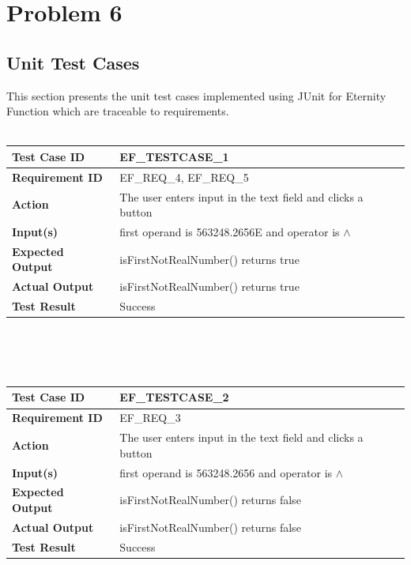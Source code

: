 \documentclass[11pt, english]{report}
\begin{document}
\chapter{Problem 6}

\section{Unit Test Cases}

This section presents the unit test cases implemented using JUnit for Eternity Function which are traceable to requirements. \\ \\

\setlength{\tabcolsep}{18pt}
\renewcommand{\arraystretch}{1.5}
\begin{tabular}{ |p{4cm}|p{8cm}| }
\hline
\textbf{Test Case ID} & EF\_TESTCASE\_1 \\ \hline 
\textbf{Requirement ID} & EF\_REQ\_4, EF\_REQ\_5\\ \hline
\textbf{Action} & The user enters input in the text field and clicks a button \\ \hline
\textbf{Input(s)} & first operand is 563248.2656E and operator is $\wedge$  \\ \hline
\textbf{Expected Output} & isFirstNotRealNumber() returns true \\ \hline
\textbf{Actual Output} & isFirstNotRealNumber() returns true \\ \hline
\textbf{Test Result} & Success \\ 
\hline
\end{tabular} \\ \\ \\

\setlength{\tabcolsep}{18pt}
\renewcommand{\arraystretch}{1.5}
\begin{tabular}{ |p{4cm}|p{8cm}| }
\hline
\textbf{Test Case ID} &  EF\_TESTCASE\_2 \\ \hline 
\textbf{Requirement ID} & EF\_REQ\_3\\ \hline
\textbf{Action} & The user enters input in the text field and clicks a button \\ \hline
\textbf{Input(s)} & first operand is 563248.2656 and operator is $\wedge$  \\ \hline
\textbf{Expected Output} & isFirstNotRealNumber() returns false \\ \hline
\textbf{Actual Output} & isFirstNotRealNumber() returns false \\ \hline 
\textbf{Test Result} & Success \\ 
\hline
\end{tabular} \\ \\ \\
\end{document}
